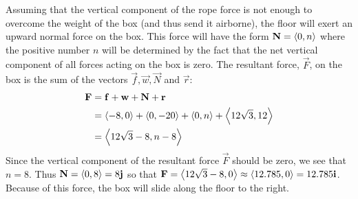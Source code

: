 \documentclass[handout]{ximera}
\begin{document}
\begin{example}
Assuming that the vertical component of the rope force is not enough to overcome the weight of the box (and thus send it airborne), 
the floor will exert an upward normal force on the box.  This force will have the form $\mathbf{N} = \left\langle 0, n\right\rangle$ where the positive 
number $n$ will be determined by the fact that the net vertical component of all forces acting on the box is zero. 
The resultant force, $\vec{F}$, on the box is the sum of the vectors $\vec{f}, \vec{w}, \vec{N}$ and $\vec{r}$:
\begin{align*}
\mathbf{F} &= \mathbf{f} + \mathbf{w} + \mathbf{N} +  \mathbf{r} \\
         &= \left\langle -8,0\right\rangle + \left\langle 0,-20\right\rangle +\left\langle 0,n\right\rangle + \left\langle 12\sqrt 3, 12\right\rangle \\
         &= \left\langle 12\sqrt 3 -8 , n-8\right\rangle
\end{align*}
Since the vertical component of the resultant force $\vec{F}$ should be zero, we see that $n = 8$. 
Thus $\mathbf{N} = \left\langle 0,8\right\rangle = 8\mathbf{j}$ so that $\mathbf{F} = \left\langle 12\sqrt 3 -8, 0\right\rangle \approx \left\langle 12.785,0\right\rangle = 12.785\mathbf{i}$. Because of this force, 
the box will slide along the floor to the right.





\end{example}
\end{document}
